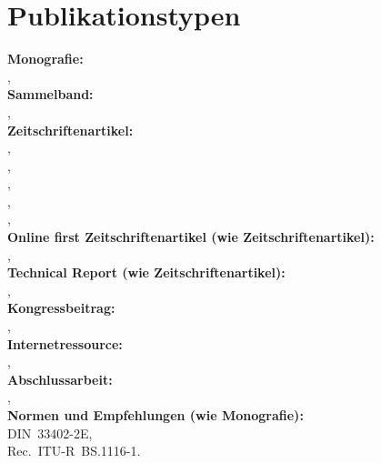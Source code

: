 \documentclass[12pt,oneside,a4paper]{scrartcl}	%
\begin{document}
\section{Publikationstypen}

\hspace{.4cm}\textbf{Monografie:}\\
\cite{Bortz2005},\\

\textbf{Sammelband:}\\
\cite{Ahnert2008},\\

\textbf{Zeitschriftenartikel:}\\
\cite{Barron1971},\\
\cite{Berg2006},\\
\cite{Reichhardt1955},\\
\cite{Moller1996},\\
\cite{Blauert1978},\\

\textbf{Online first Zeitschriftenartikel (wie Zeitschriftenartikel):}\\
\cite{Brodsky2011},\\

\textbf{Technical Report (wie Zeitschriftenartikel):}\\
\cite{Somerville1963},\\

\textbf{Kongressbeitrag:}\\
\cite{Berg2000},\\

\textbf{Internetressource:}\\
\cite{Ledergerber2002},\\

\textbf{Abschlussarbeit:}\\
\cite{Lindau2006},\\

\textbf{Normen und Empfehlungen (wie Monografie):}\\
DIN~33402-2E\nocite{DIN33402-2E},\\  %
Rec.~ITU-R~BS.1116-1\nocite{ITU_R1116-1}.\\
\end{document}
